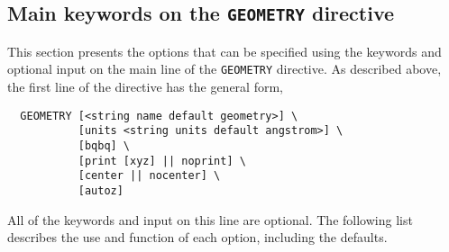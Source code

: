 \subsection{Main keywords on the {\tt GEOMETRY} directive}

This section presents the options that can be specified using the keywords 
and optional input on the main line of the {\tt GEOMETRY} directive.
As described above, the first line of the directive has the general form,
\begin{verbatim}
  GEOMETRY [<string name default geometry>] \
           [units <string units default angstrom>] \
           [bqbq] \
           [print [xyz] || noprint] \
           [center || nocenter] \
           [autoz]
\end{verbatim}
    
All of the keywords and input on this line are optional.  The following
list describes the use and function of each option, including the defaults.

